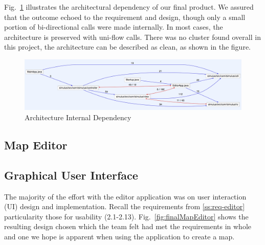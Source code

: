 Fig.~\ref{fig:archIntDependency} illustrates the architectural dependency of our final product. We assured that the outcome echoed to the requirement and design, though only a small portion of bi-directional calls were made internally. In most cases, the architecture is preserved with uni-flow calls. There was no cluster found overall in this project, the architecture can be described as clean, as shown in the figure. 

\begin{figure}[h]
	\begin{center}
			\includegraphics[width=\textwidth]{img/archIntDependency.png}
		\caption{Architecture Internal Dependency}
	\label{fig:archIntDependency}
	\end{center}
\end{figure}

\clearpage
\subsection{Map Editor}

\subsection{Graphical User Interface}
The majority of the effort with the editor application was on user interaction (UI) design and implementation. Recall the requirements from \ref{ss:req-editor} particularity those for usability (2.1-2.13). Fig.~\ref{fig:finalMapEditor} shows the resulting design chosen which the team felt had met the requirements in whole and one we hope is apparent when using the application to create a map.


